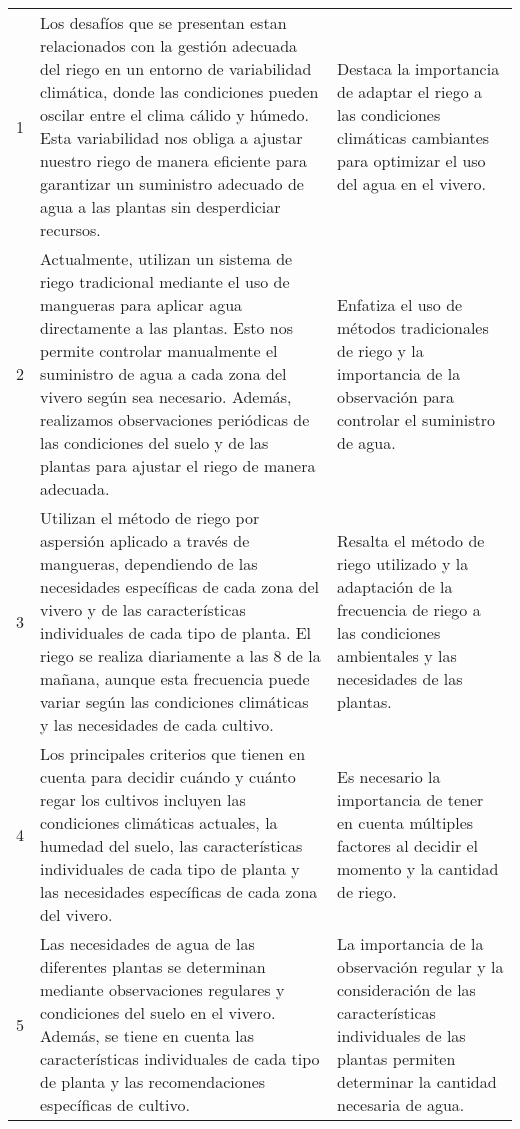 \begin{longtable}{|p{0.5cm}|p{6.5cm}|p{5.5cm}|}
	1                                                 & Los desafíos que se presentan estan relacionados con la gestión adecuada del riego en un entorno de variabilidad climática, donde las condiciones pueden oscilar entre el clima cálido y húmedo. Esta variabilidad nos obliga a ajustar nuestro riego de manera eficiente para garantizar un suministro adecuado de agua a las plantas sin desperdiciar recursos.             & Destaca la importancia de adaptar el riego a las condiciones climáticas cambiantes para optimizar el uso del agua en el vivero.                                                      \\
	2                                                 & Actualmente, utilizan un sistema de riego tradicional mediante el uso de mangueras para aplicar agua directamente a las plantas. Esto nos permite controlar manualmente el suministro de agua a cada zona del vivero según sea necesario. Además, realizamos observaciones periódicas de las condiciones del suelo y de las plantas para ajustar el riego de manera adecuada. & Enfatiza el uso de métodos tradicionales de riego y la importancia de la observación para controlar el suministro de agua.                                                           \\
	3                                                 & Utilizan el método de riego por aspersión aplicado a través de mangueras, dependiendo de las necesidades específicas de cada zona del vivero y de las características individuales de cada tipo de planta. El riego se realiza diariamente a las 8 de la mañana, aunque esta frecuencia puede variar según las condiciones climáticas y las necesidades de cada cultivo.      & Resalta el método de riego utilizado y la adaptación de la frecuencia de riego a las condiciones ambientales y las necesidades de las plantas.                                       \\
	4                                                 & Los principales criterios que tienen en cuenta para decidir cuándo y cuánto regar los cultivos incluyen las condiciones climáticas actuales, la humedad del suelo, las características individuales de cada tipo de planta y las necesidades específicas de cada zona del vivero.                                                                                             & Es necesario la importancia de tener en cuenta múltiples factores al decidir el momento y la cantidad de riego.                                                                      \\
	5                                                 & Las necesidades de agua de las diferentes plantas se determinan mediante observaciones regulares y condiciones del suelo en el vivero. Además, se tiene en cuenta las características individuales de cada tipo de planta y las recomendaciones específicas de cultivo.                                                                                                       & La importancia de la observación regular y la consideración de las características individuales de las plantas permiten determinar la cantidad necesaria de agua.                    \\

\end{longtable}
